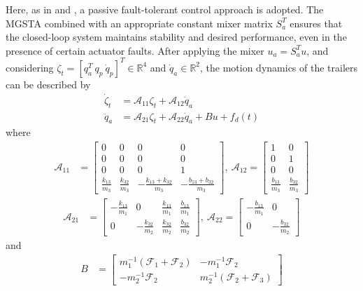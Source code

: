 \documentclass[twocolumn]{autarc_LH}
\begin{document}
Here, as in \cite{HCC:2003} and \cite{CCH:2003}, a passive fault-tolerant control approach is adopted. The MGSTA combined with an appropriate constant mixer matrix $S_a^T$ ensures that the closed-loop system maintains stability and desired performance, even in the presence of certain actuator faults. After applying the mixer $u_a = S_a^T u$, and considering $\zeta_t = [q_a^T~q_{p}~\dot{q}_{p}]^T \in \mathbb{R}^4$ and $\dot{q}_a  \in \mathbb{R}^2$, the motion dynamics of the trailers can be described by
\begin{align*}
    \dot \zeta_t & = \mathcal{A}_{11} \zeta_t + \mathcal{A}_{12}  \dot{q}_a \\
    \ddot{q}_a & = \mathcal{A}_{21} \zeta_t + \mathcal{A}_{22}  \dot{q}_a + B u + f_d(t) 
\end{align*}
where
\begin{align*}
\mathcal{A}_{11} & = \left[ \begin{array}{cccc} 0 & 0 & 0 & 0 \\ 0 & 0 & 0 & 0 \\ 0 & 0 & 0 & 1 \\ \frac{k_{13}}{m_3} & \frac{k_{32}}{m_3} & -\frac{k_{13}+k_{32}}{m_3} & -\frac{b_{13}+b_{32}}{m_3}  \end{array} \right], ~
\mathcal{A}_{12} = \left[ \!\! \begin{array}{cc} 1 & 0 \\ 0 & 1 \\ 0 & 0 \\ \frac{b_{13}}{m_3} &  
\frac{b_{32}}{m_3} \end{array} \!\! \right] 
\end{align*}
\begin{align*}
\mathcal{A}_{21} & \!=\! \left[ \!\! \begin{array}{cccc}
         -\frac{k_{13}}{m_1} & 0 & \frac{k_{13}}{m_1} & \frac{b_{13}}{m_1}  \\ 0 & -\frac{k_{32}}{m_2} & \frac{k_{32}}{m_2} &  \frac{b_{32}}{m_2} \end{array} \!\! \right],~
\mathcal{A}_{22} \!=\! \left[ \begin{array}{cc}
         -\frac{b_{13}}{m_1} & 0 \\
         0 & -\frac{b_{32}}{m_2} \end{array} \right]
\end{align*}
and
\begin{align*}
B &= \left[ \begin{array}{cc}
         m_1^{-1} ( \mathcal{F}_1 + \mathcal{F}_2 )  & -m_1^{-1} \mathcal{F}_2  \\
         -m_2^{-1} \mathcal{F}_2 & m_2^{-1}  ( \mathcal{F}_2 + \mathcal{F}_3 ) \end{array} \right] 
\end{align*}
\end{document}
